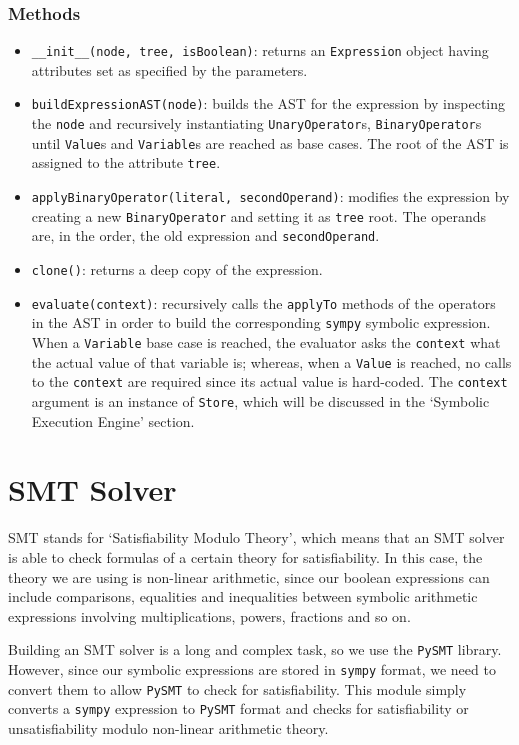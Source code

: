 \documentclass[12pt,a4paper]{report}
\theoremstyle{definition}
\theoremstyle{definition}
\theoremstyle{definition}
\begin{document}
\subsubsection{Methods}
\begin{itemize}
    \itemsep 0em
    \item \texttt{\_\_init\_\_(node, tree, isBoolean)}: returns an \texttt{Expression} object having attributes set as specified by the parameters.
    \item \texttt{buildExpressionAST(node)}: builds the AST for the expression by inspecting the \texttt{node} and recursively instantiating \texttt{UnaryOperator}s, \texttt{BinaryOperator}s until \texttt{Value}s and \texttt{Variable}s are reached as base cases. The root of the AST is assigned to the attribute \texttt{tree}.
    \item \texttt{applyBinaryOperator(literal, secondOperand)}: modifies the expression by creating a new \texttt{BinaryOperator} and setting it as \texttt{tree} root. The operands are, in the order, the old expression and \texttt{secondOperand}.
    \item \texttt{clone()}: returns a deep copy of the expression.
    \item \texttt{evaluate(context)}: recursively calls the \texttt{applyTo} methods of the operators in the AST in order to build the corresponding \texttt{sympy} symbolic expression. When a \texttt{Variable} base case is reached, the evaluator asks the \texttt{context} what the actual value of that variable is; whereas, when a \texttt{Value} is reached, no calls to the \texttt{context} are required since its actual value is hard-coded. The \texttt{context} argument is an instance of \texttt{Store}, which will be discussed in the `Symbolic Execution Engine' section.
\end{itemize}


\section{SMT Solver}
SMT stands for `Satisfiability Modulo Theory', which means that an SMT solver is able to check formulas of a certain theory for satisfiability. In this case, the theory we are using is non-linear arithmetic, since our boolean expressions can include comparisons, equalities and inequalities between symbolic arithmetic expressions involving multiplications, powers, fractions and so on.

Building an SMT solver is a long and complex task, so we use the \texttt{PySMT} library. However, since our symbolic expressions are stored in \texttt{sympy} format, we need to convert them to allow \texttt{PySMT} to check for satisfiability.
This module simply converts a \texttt{sympy} expression to \texttt{PySMT} format and checks for satisfiability or unsatisfiability modulo non-linear arithmetic theory.
\end{document}
